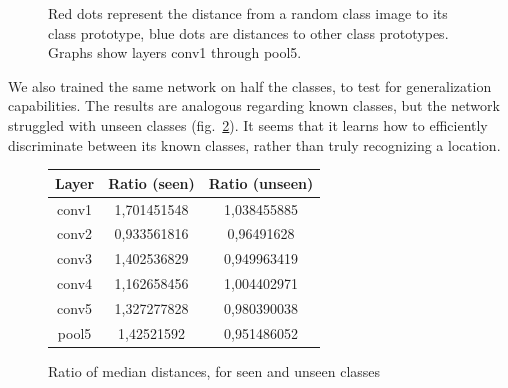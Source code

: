 \begin{figure}[htb]
\begin{tabular}{ccc}
\end{tabular}
\caption{Red dots represent the distance from a random class image to its class prototype, blue dots are distances to other class prototypes. Graphs show layers conv1 through pool5.}
\label{allclft}
\end{figure}

We also trained the same network on half the classes, to test for generalization capabilities. The results are analogous regarding known classes, but the network struggled with unseen classes (fig.~\ref{halftrainvalues}). It seems that it learns how to efficiently discriminate between its known classes, rather than truly recognizing a location.

\begin{figure}[htb]
\centering
\begin{tabular}{|c|c|c|}
  \hline
   Layer & Ratio (seen) & Ratio (unseen) \\
  \hline
  conv1 & 1,701451548 & 1,038455885 \\
  conv2 & 0,933561816 & 0,96491628 \\
  conv3 & 1,402536829 & 0,949963419 \\
  conv4 & 1,162658456 & 1,004402971 \\
  conv5 & 1,327277828 & 0,980390038 \\
  pool5 & 1,42521592 & 0,951486052 \\
  \hline
\end{tabular}
\caption{Ratio of median distances, for seen and unseen classes}
\label{halftrainvalues}
\end{figure}
